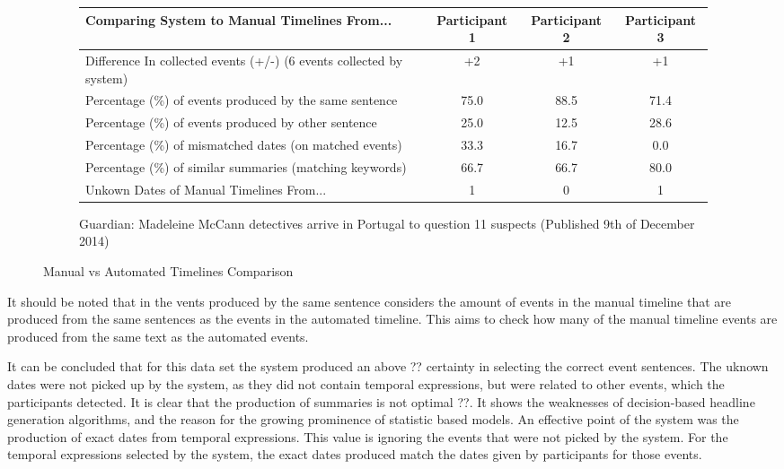 \begin{figure}[h]
\begin{subfigure}{.5\textwidth}
\begin{tabular}{ |p{5cm}|c|c|c| } 
 \hline
Comparing System to Manual Timelines From... & Participant 1 & Participant 2 & Participant 3\\
\hline
\hline
Difference In collected events (+/-) (6 events collected by system) &  +2 & +1 & +1 \\
\hline
Percentage (\%) of events produced by the same sentence & 75.0 & 88.5 & 71.4\\
\hline
Percentage (\%) of events produced by other sentence & 25.0 & 12.5 & 28.6\\
\hline
Percentage (\%) of mismatched dates (on matched events) & 33.3 & 16.7 & 0.0\\
\hline
Percentage (\%) of similar summaries (matching keywords) & 66.7 & 66.7 & 80.0\\
\hline
Unkown Dates of Manual Timelines From... & 1 & 0 & 1\\
\hline
\end{tabular}
\caption{Guardian: Madeleine McCann detectives arrive in Portugal to question 11 suspects (Published 9th of December 2014)}
\end{subfigure}

\caption{Manual vs Automated Timelines Comparison}
\label{fig:tableAnalysis}
\end{figure}
\par It should be noted that in the vents produced by the same sentence considers the amount of events in the manual timeline that are produced from the same sentences as the events in the automated timeline. This aims to check how many of the manual timeline events are produced from the same text as the automated events.
\par It can be concluded that for this data set the system produced an above ?? certainty in selecting the correct event sentences. The uknown dates were not picked up by the system, as they did not contain temporal expressions, but were related to other events, which the participants detected. It is clear that the production of summaries is not optimal ??. It shows the weaknesses of decision-based headline generation algorithms, and the reason for the growing prominence of statistic based models. An effective point of the system was the production of exact dates from temporal expressions. This value is ignoring the events that were not picked by the system. For the temporal expressions selected by the system, the exact dates produced match the dates given by participants for those events.
